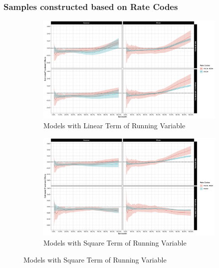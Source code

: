 \subsubsection{Samples constructed based on Rate Codes}
\begin{figure}
    \begin{subfigure}{1.0\textwidth}
        \centering
        \includegraphics[scale = 0.108]{02_Plots/Regression-Results_RD-Design_Treatment-Effect-by-BW-and-Rate-Codes_Linear}
        \caption{Models with Linear Term of Running Variable}
        \label{Figure:Estimated-Treatment-Effects_By-Rate-Code-and-Season_Linear}
        \vspace{0.3cm}
    \end{subfigure}
    \newline
    \begin{subfigure}{1.0\textwidth}
        \centering
        \includegraphics[scale = 0.108]{02_Plots/Regression-Results_RD-Design_Treatment-Effect-by-BW-and-Rate-Codes_Square}
        \caption{Models with Square Term of Running Variable}
        \label{Figure:Estimated-Treatment-Effects_By-Rate-Code-and-Season_Square}

\end{subfigure}
\end{figure}
